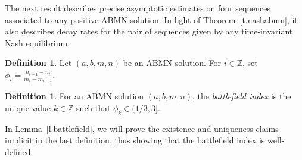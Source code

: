 \documentclass[letterpaper,11pt,oneside,reqno]{amsbook}
\newcommand{\Z}{\ensuremath{\mathbb{Z}}}
\numberwithin{figure}{chapter}
\theoremstyle{definition}
\theoremstyle{definition}
\theoremstyle{definition}
\newtheorem{definition}[theorem]{Definition}
\theoremstyle{definition}
\theoremstyle{definition}
\newcommand{\macphi}{\phi}
\newcommand{\abmnmacspace}{\textrm{ABMN} }
\def\hfff#1{\label{#1}}
\begin{document}
The next result describes  precise asymptotic estimates on four sequences associated to any positive \abmnmacspace solution. In light of Theorem~\ref{t.nashabmn}, it also describes decay rates for the pair of sequences given by any time-invariant Nash equilibrium.
  \begin{definition}\label{d.deltai}
Let  $(a,b,m,n)$ be an \abmnmacspace solution. For $i \in \Z$, set\hfff{phi}   
$\macphi_i = \frac{n_{i-1} - n_i}{m_i - m_{i-1}}$.
  \end{definition}
\begin{definition}\label{d.battlefield}
For an \abmnmacspace solution $(a,b,m,n)$,  the {\em battlefield index}\hfff{battlefield} is the unique value $k \in \Z$ such that $\macphi_k \in (1/3,3]$.
\end{definition}
In Lemma~\ref{l.battlefield}, we will prove the existence and uniqueness claims implicit in the last definition, thus showing that the battlefield index is well-defined. 
\end{document}
